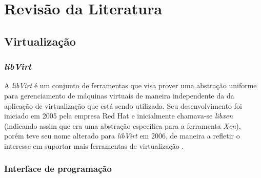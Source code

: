 %
%

\chapter{Revisão da Literatura}



\section{Virtualização}

% 

\subsection{\emph{libVirt}}


A \emph{libVirt} é um conjunto de ferramentas que visa prover uma abstração
uniforme para gerenciamento de máquinas virtuais de maneira independente da
da aplicação de virtualização que está sendo utilizada. Seu desenvolvimento
foi iniciado em 2005 pela empresa Red Hat e inicialmente chamava-se
\emph{libxen} (indicando assim que era uma abstração específica para a
ferramenta \emph{Xen}), porém teve seu nome alterado para \emph{libVirt} em
2006, de maneira a refletir o interesse em suportar mais ferramentas de
virtualização .

\subsection{Interface de programação}


